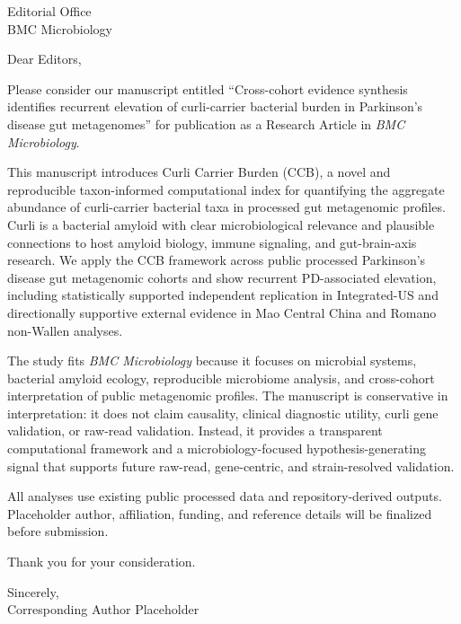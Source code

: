\documentclass[12pt]{letter}
\begin{document}
\begin{letter}{Editorial Office\\BMC Microbiology}
\opening{Dear Editors,}

Please consider our manuscript entitled ``Cross-cohort evidence synthesis identifies recurrent elevation of curli-carrier bacterial burden in Parkinson's disease gut metagenomes'' for publication as a Research Article in \textit{BMC Microbiology}.

This manuscript introduces Curli Carrier Burden (CCB), a novel and reproducible taxon-informed computational index for quantifying the aggregate abundance of curli-carrier bacterial taxa in processed gut metagenomic profiles. Curli is a bacterial amyloid with clear microbiological relevance and plausible connections to host amyloid biology, immune signaling, and gut-brain-axis research. We apply the CCB framework across public processed Parkinson's disease gut metagenomic cohorts and show recurrent PD-associated elevation, including statistically supported independent replication in Integrated-US and directionally supportive external evidence in Mao Central China and Romano non-Wallen analyses.

The study fits \textit{BMC Microbiology} because it focuses on microbial systems, bacterial amyloid ecology, reproducible microbiome analysis, and cross-cohort interpretation of public metagenomic profiles. The manuscript is conservative in interpretation: it does not claim causality, clinical diagnostic utility, curli gene validation, or raw-read validation. Instead, it provides a transparent computational framework and a microbiology-focused hypothesis-generating signal that supports future raw-read, gene-centric, and strain-resolved validation.

All analyses use existing public processed data and repository-derived outputs. Placeholder author, affiliation, funding, and reference details will be finalized before submission.

Thank you for your consideration.

\closing{Sincerely,\\Corresponding Author Placeholder}

\end{letter}
\end{document}
